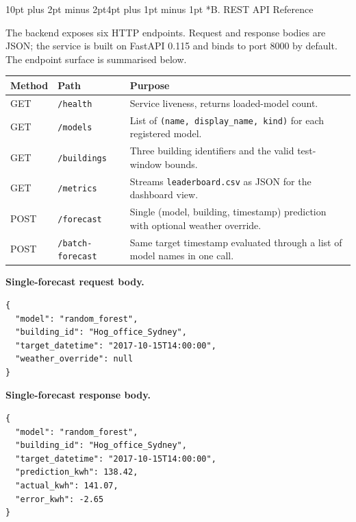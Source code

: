 \documentclass[12pt,a4paper,openany]{report}
\makeatletter
\renewcommand{\section}{\@startsection{section}{1}{\z@}%
  {10pt plus 2pt minus 2pt}{4pt plus 1pt minus 1pt}%
  {\normalfont\normalsize\bfseries}}
\makeatother
\begin{document}
\section*{B. REST API Reference}

The backend exposes six HTTP endpoints. Request and response bodies are JSON; the service is built on FastAPI 0.115 and binds to port 8000 by default. The endpoint surface is summarised below.

\medskip
\noindent
\begin{tabular}{|l|l|p{7.8cm}|}
\hline
\textbf{Method} & \textbf{Path} & \textbf{Purpose} \\
\hline
GET  & \texttt{/health}         & Service liveness, returns loaded-model count.                       \\
GET  & \texttt{/models}         & List of \texttt{(name, display\_name, kind)} for each registered model. \\
GET  & \texttt{/buildings}      & Three building identifiers and the valid test-window bounds.            \\
GET  & \texttt{/metrics}        & Streams \texttt{leaderboard.csv} as JSON for the dashboard view.       \\
POST & \texttt{/forecast}       & Single (model, building, timestamp) prediction with optional weather override. \\
POST & \texttt{/batch-forecast} & Same target timestamp evaluated through a list of model names in one call.       \\
\hline
\end{tabular}
\medskip

\begin{samepage}
\textbf{Single-forecast request body.}
\begin{verbatim}
{
  "model": "random_forest",
  "building_id": "Hog_office_Sydney",
  "target_datetime": "2017-10-15T14:00:00",
  "weather_override": null
}
\end{verbatim}
\end{samepage}

\begin{samepage}
\textbf{Single-forecast response body.}
\begin{verbatim}
{
  "model": "random_forest",
  "building_id": "Hog_office_Sydney",
  "target_datetime": "2017-10-15T14:00:00",
  "prediction_kwh": 138.42,
  "actual_kwh": 141.07,
  "error_kwh": -2.65
}
\end{verbatim}
\end{samepage}
\end{document}
